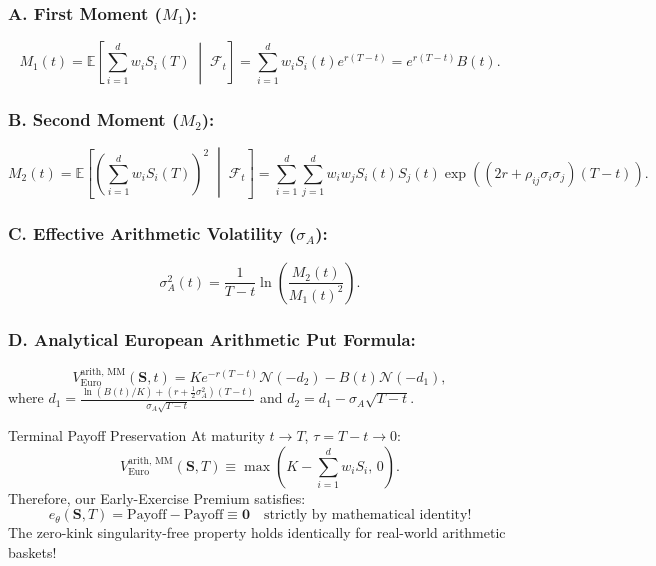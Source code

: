 \documentclass[11pt,a4paper]{article}
\begin{document}
\subsubsection{A. First Moment ($M_1$):}
\begin{equation}
    M_1(t) = \mathbb{E}\left[ \sum_{i=1}^d w_i S_i(T) \;\middle|\; \mathcal{F}_t \right] = \sum_{i=1}^d w_i S_i(t) e^{r(T-t)} = e^{r(T-t)} B(t).
\end{equation}

\subsubsection{B. Second Moment ($M_2$):}
\begin{equation}
    M_2(t) = \mathbb{E}\left[ \left(\sum_{i=1}^d w_i S_i(T)\right)^2 \;\middle|\; \mathcal{F}_t \right] = \sum_{i=1}^d \sum_{j=1}^d w_i w_j S_i(t) S_j(t) \exp\left((2r + \rho_{ij}\sigma_i\sigma_j)(T-t)\right).
\end{equation}

\subsubsection{C. Effective Arithmetic Volatility ($\sigma_A$):}
\begin{equation}
    \sigma_A^2(t) = \frac{1}{T-t} \ln\left( \frac{M_2(t)}{M_1(t)^2} \right).
\end{equation}

\subsubsection{D. Analytical European Arithmetic Put Formula:}
\begin{equation}
    V_{\text{Euro}}^{\text{arith, MM}}(\mathbf{S}, t) = K e^{-r(T-t)} \mathcal{N}(-d_2) - B(t) \mathcal{N}(-d_1),
\end{equation}
where $d_1 = \frac{\ln(B(t)/K) + (r + \frac{1}{2}\sigma_A^2)(T-t)}{\sigma_A\sqrt{T-t}}$ and $d_2 = d_1 - \sigma_A\sqrt{T-t}$.

\begin{mathbox}{Terminal Payoff Preservation}
At maturity $t \to T$, $\tau = T-t \to 0$:
\begin{equation}
    V_{\text{Euro}}^{\text{arith, MM}}(\mathbf{S}, T) \equiv \max\left( K - \sum_{i=1}^d w_i S_i, \, 0 \right).
\end{equation}
Therefore, our Early-Exercise Premium satisfies:
\begin{equation}
    e_\theta(\mathbf{S}, T) = \text{Payoff} - \text{Payoff} \equiv \mathbf{0} \quad \text{strictly by mathematical identity!}
\end{equation}
The zero-kink singularity-free property holds identically for real-world arithmetic baskets!
\end{mathbox}
\end{document}
